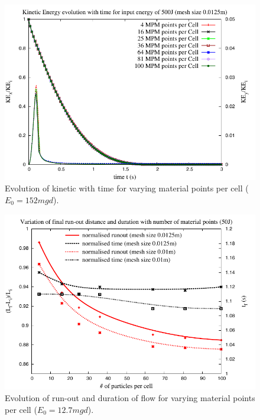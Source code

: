 \begin{figure}[tbhp]
\centering
\includegraphics[width=\textwidth]{KE_500}
\caption{Evolution of kinetic with time for varying material points per cell ($E_0=152mgd$).}
\label{fig:KE_500}
\end{figure}

\begin{figure}[tbhp]
\centering
\includegraphics[width=\textwidth]{50}
\caption{Evolution of run-out and duration of flow  for varying material points per cell ($E_0=12.7mgd$).}
\label{fig:50}
\end{figure}

